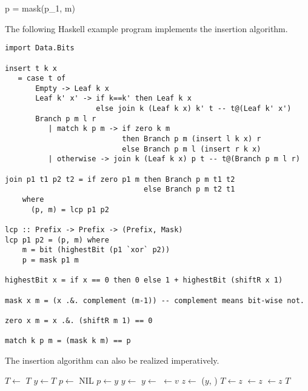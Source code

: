 \documentclass[b5paper]{article}
\begin{document}
\be
p = mask(p_1, m)
\ee

The following Haskell example program implements the insertion algorithm.

\lstset{language=Haskell}
\begin{lstlisting}
import Data.Bits

insert t k x
   = case t of
       Empty -> Leaf k x
       Leaf k' x' -> if k==k' then Leaf k x
                     else join k (Leaf k x) k' t -- t@(Leaf k' x')
       Branch p m l r
          | match k p m -> if zero k m
                           then Branch p m (insert l k x) r
                           else Branch p m l (insert r k x)
          | otherwise -> join k (Leaf k x) p t -- t@(Branch p m l r)

join p1 t1 p2 t2 = if zero p1 m then Branch p m t1 t2
                                else Branch p m t2 t1
    where
      (p, m) = lcp p1 p2

lcp :: Prefix -> Prefix -> (Prefix, Mask)
lcp p1 p2 = (p, m) where
    m = bit (highestBit (p1 `xor` p2))
    p = mask p1 m

highestBit x = if x == 0 then 0 else 1 + highestBit (shiftR x 1)

mask x m = (x .&. complement (m-1)) -- complement means bit-wise not.

zero x m = x .&. (shiftR m 1) == 0

match k p m = (mask k m) == p
\end{lstlisting}

The insertion algorithm can also be realized imperatively.

\begin{algorithmic}[1]
    \State $T \gets$ 
    \State \Return $T$
  \EndIf
  \State $y \gets T$
  \State $p \gets$ NIL
    \State $p \gets y$
      \State $y \gets$ 
    \Else
      \State $y \gets$ 
    \EndIf
  \EndWhile
    \State {} $\gets v$
  \Else
    \State $z \gets$ ($y$, )
      \State $T \gets z$
    \Else
        \State {} $\gets z$
      \Else
        \State {} $\gets z$
      \EndIf
    \EndIf
  \EndIf
  \State \Return $T$
\EndFunction
\end{algorithmic}
\end{document}
